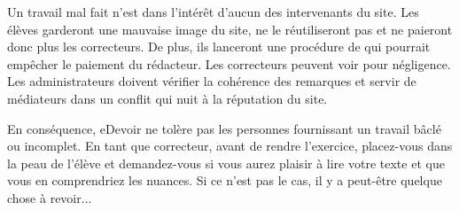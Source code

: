 ﻿Un travail mal fait n'est dans l'intérêt d'aucun des intervenants du site.
Les élèves garderont une mauvaise image du site, ne le réutiliseront pas et ne paieront donc plus les correcteurs. De plus, ils lanceront une procédure de  qui pourrait empêcher le paiement du rédacteur.
Les correcteurs peuvent voir  pour négligence.
Les administrateurs doivent vérifier la cohérence des remarques et servir de médiateurs dans un conflit qui nuit à la réputation du site.

En conséquence, eDevoir ne tolère pas les personnes fournissant un travail bâclé ou incomplet. En tant que correcteur, avant de rendre l'exercice, placez-vous dans la peau de l'élève et demandez-vous si vous aurez plaisir à lire votre texte et que vous en comprendriez les nuances. Si ce n'est pas le cas, il y a peut-être quelque chose à revoir...